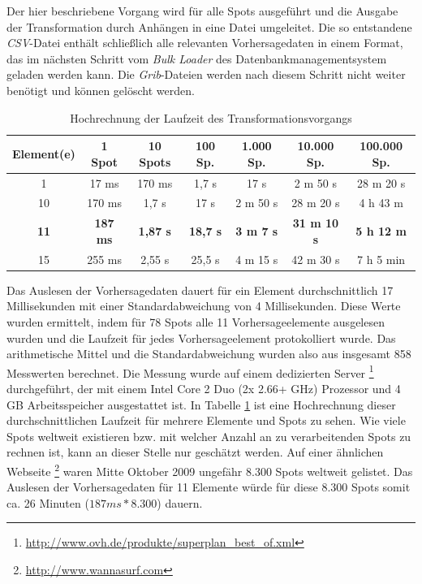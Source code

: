 

Der hier beschriebene Vorgang wird für alle Spots ausgeführt und die
Ausgabe der Transformation durch Anhängen in eine Datei
umgeleitet. Die so entstandene \textit{CSV}-Datei enthält schließlich
alle relevanten Vorhersagedaten in einem Format, das im nächsten
Schritt vom \textit{Bulk Loader} des Datenbankmanagementsystem geladen werden
kann. Die \textit{Grib}-Dateien werden nach diesem Schritt nicht
weiter benötigt und können gelöscht werden.
\begin{table}[h]
  \centering
  {\sf
    \footnotesize
    \begin{longtable}{c|c|c|c|c|c|c}

      \toprule
      \textbf{Element(e)} & \textbf{1 Spot} & \textbf{10 Spots} & \textbf{100 Sp.} & \textbf{1.000 Sp.} & \textbf{10.000 Sp.} & \textbf{100.000 Sp.} \\
      \midrule
      1 & 17 ms & 170 ms & 1,7 s & 17 s & 2 m 50 s & 28 m 20 s \\
      10 & 170 ms & 1,7 s & 17 s & 2 m 50 s & 28 m 20 s & 4 h 43 m \\
      \textbf{11} & \textbf{187 ms} &  \textbf{1,87 s} & \textbf{18,7 s} & \textbf{3 m 7 s} & \textbf{31 m 10 s} & \textbf{5 h 12 m} \\
      15 & 255 ms & 2,55 s & 25,5 s & 4 m 15 s & 42 m 30 s &  7 h 5 min\\
      \bottomrule
    \end{longtable}
  }

  \caption{Hochrechnung der Laufzeit des Transformationsvorgangs}
  \label{tab:transformation_laufzeit}

\end{table}

Das Auslesen der Vorhersagedaten dauert für ein Element
durchschnittlich 17 Millisekunden mit einer Standardabweichung von 4
Millisekunden. Diese Werte wurden ermittelt, indem für 78 Spots alle
11 Vorhersageelemente ausgelesen wurden und die Laufzeit für jedes
Vorhersageelement protokolliert wurde. Das arithmetische Mittel und
die Standardabweichung wurden also aus insgesamt 858 Messwerten
berechnet. Die Messung wurde auf einem dedizierten Server
\footnote{\url{http://www.ovh.de/produkte/superplan_best_of.xml}}
durchgeführt, der mit einem Intel Core 2 Duo (2x 2.66+ GHz) Prozessor
und 4 GB Arbeitsspeicher ausgestattet ist. In Tabelle
\ref{tab:transformation_laufzeit} ist eine Hochrechnung dieser
durchschnittlichen Laufzeit für mehrere Elemente und Spots zu
sehen. Wie viele Spots weltweit existieren bzw. mit welcher Anzahl an
zu verarbeitenden Spots zu rechnen ist, kann an dieser Stelle nur
geschätzt werden. Auf einer ähnlichen Webseite
\footnote{\url{http://www.wannasurf.com}} waren Mitte Oktober 2009
ungefähr 8.300 Spots weltweit gelistet. Das Auslesen der
Vorhersagedaten für 11 Elemente würde für diese 8.300 Spots somit
ca. 26 Minuten ($187 ms * 8.300$) dauern.

